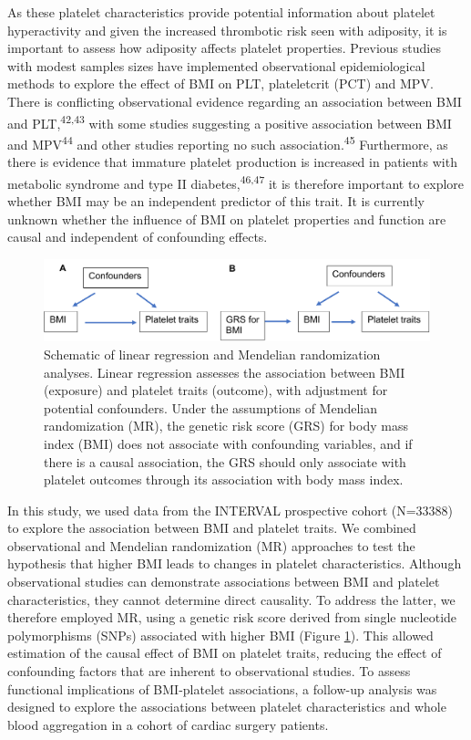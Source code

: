 \documentclass[11pt,twoside]{bristolthesis}
\begin{document}
As these platelet characteristics provide potential information about platelet hyperactivity and given the increased thrombotic risk seen with adiposity, it is important to assess how adiposity affects platelet properties. Previous studies with modest samples sizes have implemented observational epidemiological methods to explore the effect of BMI on PLT, plateletcrit (PCT) and MPV. There is conflicting observational evidence regarding an association between BMI and PLT,\textsuperscript{42,43} with some studies suggesting a positive association between BMI and MPV\textsuperscript{44} and other studies reporting no such association.\textsuperscript{45} Furthermore, as there is evidence that immature platelet production is increased in patients with metabolic syndrome and type II diabetes,\textsuperscript{46,47} it is therefore important to explore whether BMI may be an independent predictor of this trait. It is currently unknown whether the influence of BMI on platelet properties and function are causal and independent of confounding effects.
\begin{figure}
\includegraphics{figure/BMI_platelets/obsvMRexample} \caption[Schematic of linear regression and Mendelian randomization analyses]{Schematic of linear regression and Mendelian randomization analyses. Linear regression assesses the association between BMI (exposure) and platelet traits (outcome), with adjustment for potential confounders. Under the assumptions of Mendelian randomization (MR), the genetic risk score (GRS) for body mass index (BMI) does not associate with confounding variables, and if there is a causal association, the GRS should only associate with platelet outcomes through its association with body mass index.}\label{fig:Linear-reg-MR}
\end{figure}
In this study, we used data from the INTERVAL prospective cohort (N=33388) to explore the association between BMI and platelet traits. We combined observational and Mendelian randomization (MR) approaches to test the hypothesis that higher BMI leads to changes in platelet characteristics. Although observational studies can demonstrate associations between BMI and platelet characteristics, they cannot determine direct causality. To address the latter, we therefore employed MR, using a genetic risk score derived from single nucleotide polymorphisms (SNPs) associated with higher BMI (Figure \ref{fig:Linear-reg-MR}). This allowed estimation of the causal effect of BMI on platelet traits, reducing the effect of confounding factors that are inherent to observational studies. To assess functional implications of BMI-platelet associations, a follow-up analysis was designed to explore the associations between platelet characteristics and whole blood aggregation in a cohort of cardiac surgery patients.
\end{document}
